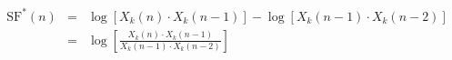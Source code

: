\documentclass{article}
\begin{document}
 
\begin{eqnarray*}
\mbox{SF}^{*}(n)  &=&   \log\left[X_k(n) \cdot X_k(n-1)\right] - \log\left[X_k(n-1) \cdot X_k(n-2)\right] \\
&=& \log\left[  \frac{X_k(n) \cdot X_k(n-1)}{X_k(n-1) \cdot X_k(n-2)} \right]
\end{eqnarray*}
 \newpage 
\end{document}
